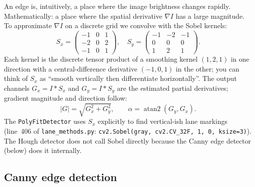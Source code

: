 An edge is, intuitively, a place where the image brightness changes
rapidly. Mathematically: a place where the spatial derivative
$\nabla I$ has a large magnitude. To approximate $\nabla I$ on a
discrete grid we convolve with the Sobel kernels:
\begin{equation}
S_x = \begin{pmatrix}-1 & 0 & 1\\-2 & 0 & 2\\-1 & 0 & 1\end{pmatrix},\quad
S_y = \begin{pmatrix}-1 & -2 & -1\\ 0 & 0 & 0\\ 1 & 2 & 1\end{pmatrix}.
\label{eq:sobel}
\end{equation}
Each kernel is the discrete tensor product of a smoothing kernel
$(1,2,1)$ in one direction with a central-difference derivative
$(-1,0,1)$ in the other; you can think of $S_x$ as ``smooth vertically
then differentiate horizontally''. The output channels $G_x=I*S_x$ and
$G_y=I*S_y$ are the estimated partial derivatives; gradient magnitude
and direction follow:
\begin{equation}
|G| = \sqrt{G_x^2+G_y^2},\qquad
\alpha = \operatorname{atan2}(G_y,G_x).
\label{eq:grad}
\end{equation}
The \texttt{PolyFitDetector} uses $S_x$ explicitly to find
vertical-ish lane markings (line~406 of \texttt{lane\_methods.py}:
\texttt{cv2.Sobel(gray, cv2.CV\_32F, 1, 0, ksize=3)}). The Hough
detector does not call Sobel directly because the Canny edge detector
(below) does it internally.

\subsection{Canny edge detection}

